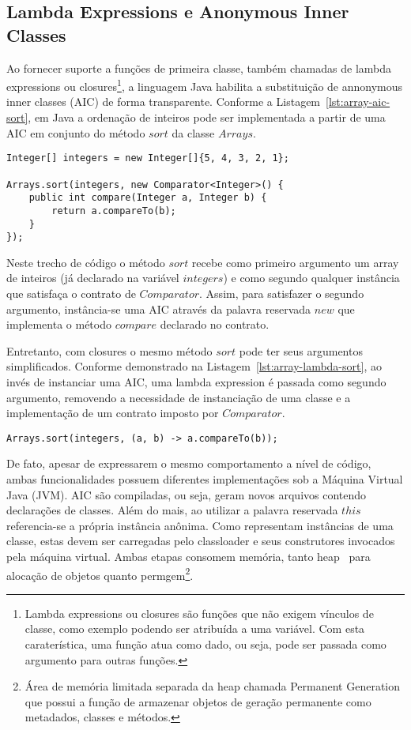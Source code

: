 \documentclass[10pt, conference]{IEEEtran}
\begin{document}
\subsection{Lambda Expressions e Anonymous Inner Classes}
Ao fornecer suporte a funções de primeira classe, também chamadas de lambda expressions ou closures\footnote{Lambda expressions ou closures são funções que não exigem vínculos de classe, como exemplo podendo ser atribuída a uma variável. Com esta caraterística, uma função atua como dado, ou seja, pode ser passada como argumento para outras funções.}, a linguagem Java habilita a substituição de annonymous inner classes (AIC) de forma transparente. Conforme a Listagem~\ref{lst:array-aic-sort}, em Java a ordenação de inteiros pode ser implementada a partir de uma AIC em conjunto do método $sort$ da classe $Arrays$.

\begin{lstlisting}[caption={Sort - Anonymous Inner Class}, label={lst:array-aic-sort}]
Integer[] integers = new Integer[]{5, 4, 3, 2, 1};

Arrays.sort(integers, new Comparator<Integer>() {
    public int compare(Integer a, Integer b) {
        return a.compareTo(b);
    }
});
\end{lstlisting}

Neste trecho de código o método $sort$ recebe como primeiro argumento um array de inteiros (já declarado na variável $integers$) e como segundo qualquer instância que satisfaça o contrato de $Comparator$. Assim, para satisfazer o segundo argumento, instância-se uma AIC através da palavra reservada $new$ que implementa o método $compare$ declarado no contrato.

Entretanto, com closures o mesmo método $sort$ pode ter seus argumentos simplificados. Conforme demonstrado na Listagem~\ref{lst:array-lambda-sort}, ao invés de instanciar uma AIC, uma lambda expression é passada como segundo argumento, removendo a necessidade de instanciação de uma classe e a implementação de um contrato imposto por $Comparator$.

\begin{lstlisting}[caption={Sort - Lambda Expression}, label={lst:array-lambda-sort}]
Arrays.sort(integers, (a, b) -> a.compareTo(b));
\end{lstlisting}

De fato, apesar de expressarem o mesmo comportamento a nível de código, ambas funcionalidades possuem diferentes implementações sob a Máquina Virtual Java (JVM). AIC são compiladas, ou seja, geram novos arquivos contendo declarações de classes. Além do mais, ao utilizar a palavra reservada $this$ referencia-se a própria instância anônima. Como representam instâncias de uma classe, estas devem ser carregadas pelo classloader e seus construtores invocados pela máquina virtual. Ambas etapas consomem memória, tanto heap~\cite{hunt2011java} para alocação de objetos quanto permgem\footnote{Área de memória limitada separada da heap chamada Permanent Generation que possui a função de armazenar objetos de geração permanente como metadados, classes e métodos.}.
\end{document}
